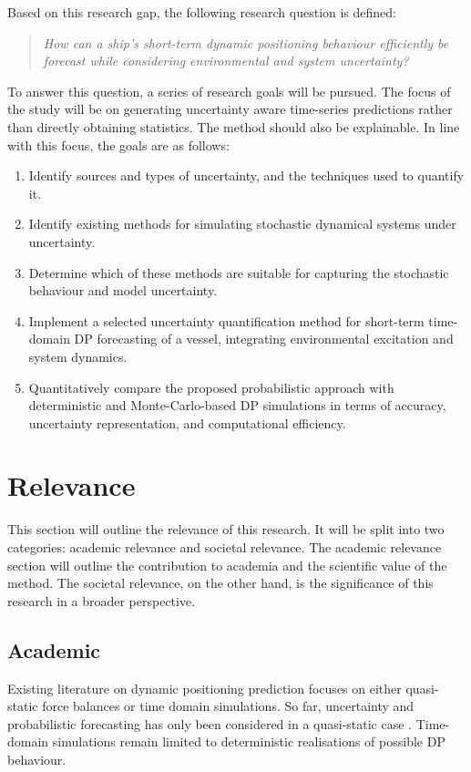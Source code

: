 Based on this research gap, the following research question is defined:

\begin{quotation}
    \emph{How can a ship's short-term dynamic positioning behaviour efficiently be forecast while considering environmental and system uncertainty?}
\end{quotation}

To answer this question, a series of research goals will be pursued. The focus of the study will be on generating
uncertainty aware time-series predictions rather than directly obtaining statistics. The method should also be
explainable. In line with this focus, the goals
are as follows: 

\begin{enumerate}
    \item Identify sources and types of uncertainty, and the techniques used to quantify it. 
    \item Identify existing methods for simulating stochastic dynamical systems under uncertainty.
    \item Determine which of these methods are suitable for capturing the stochastic behaviour and model uncertainty.
    \item Implement a selected uncertainty quantification method for short-term time-domain DP forecasting of a vessel, integrating environmental excitation and system dynamics.
    \item Quantitatively compare the proposed probabilistic approach with deterministic and Monte-Carlo-based DP simulations in terms of accuracy, uncertainty representation, and computational efficiency.
\end{enumerate}

\section{Relevance}
\label{sec:relevance}

This section will outline the relevance of this research. It will be split into two categories: academic relevance and
societal relevance. The academic relevance section will outline the contribution to academia and the scientific value of
the method. The societal relevance, on the other hand, is the significance of this research in a broader perspective.

\subsection{Academic}
Existing literature on dynamic positioning prediction focuses on either quasi-static force balances or time domain
simulations. So far, uncertainty and probabilistic forecasting has only been considered in a quasi-static case
\parencite{mauroProbabilisticApproachDynamic2022}. Time-domain simulations remain limited to deterministic realisations
of possible DP behaviour. 

